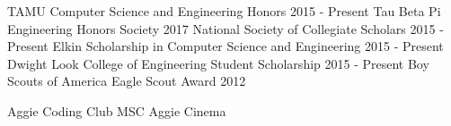 \documentclass[12pt]{article}
\begin{document}
\begin{flushleft}
\begin{outline}[compactitem]
  \1 TAMU Computer Science and Engineering Honors           \hfill 2015 - Present
  \1 Tau Beta Pi Engineering Honors Society                 \hfill 2017
  \1 National Society of Collegiate Scholars                \hfill 2015 - Present
  \1 Elkin Scholarship in Computer Science and Engineering  \hfill 2015 - Present
  \1 Dwight Look College of Engineering Student Scholarship \hfill 2015 - Present
  \1 Boy Scouts of America Eagle Scout Award                \hfill 2012
  \hfill %

  \1 Aggie Coding Club
  \1 MSC Aggie Cinema



\end{outline}
\end{flushleft}
\end{document}
